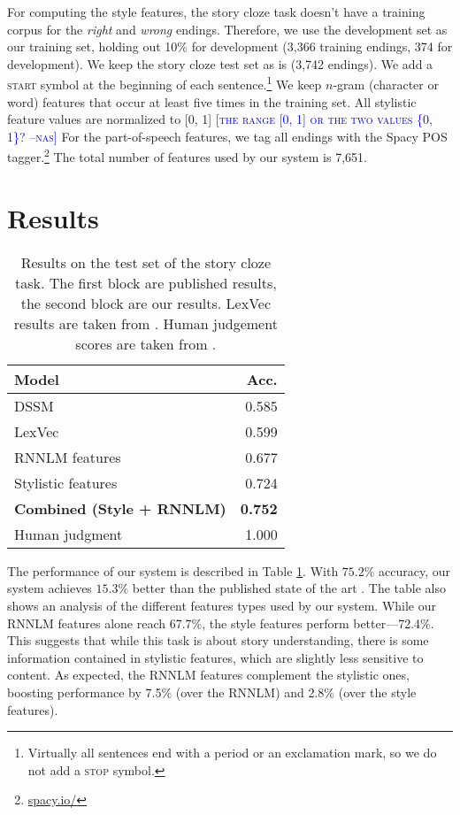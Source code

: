 \documentclass[11pt]{article}
\newcommand{\nascomment}[1]{\textcolor{blue}{[\textsc{#1 --nas}]}}
\begin{document}
For computing the style features, the story cloze task doesn't have a training corpus for the {\it right} and {\it wrong} endings.
Therefore, we use the development set as our training set, holding out 10\% for development
(3,366 training endings, 374 for development). We keep the story cloze test set as is (3,742 endings).
We add a \textsc{start} symbol at the beginning
of each sentence.\footnote{Virtually all sentences end with a period
  or an exclamation mark, so we do not add a \textsc{stop} symbol.} 
 We keep $n$-gram (character or word) features that occur at least five times in the training set.
All stylistic feature values are normalized to [0, 1] \nascomment{the
  range [0, 1] or the two values \{0, 1\}?}
For the part-of-speech features, we tag all endings with the Spacy POS tagger.\footnote{\url{spacy.io/}}
The total number of features used by our system is 7,651.


\section{Results}

\begin{table}%
\begin{center}
\begin{tabular}{|l|r|} \hline
{\bf Model} & {\bf Acc.} \\ \hline
{DSSM} \cite{Mostafazadeh:2016} & 0.585 \\ 
{LexVec} \cite{Salle:2016} & 0.599 \\ \hline\hline
{RNNLM features}		& 0.677 \\ 
{Stylistic features} & {0.724} \\ 
{\bf Combined (Style + RNNLM)} & {\bf 0.752} \\ \hline\hline
Human judgment & 1.000 \\ \hline
\end{tabular}
\end{center}
\caption{\label{cloze_results}
Results on the test set of the  story cloze task. 
The first block are published results, the second block are our results.
LexVec results are taken from \cite{Speer:2016}.
Human judgement scores are taken from \cite{Mostafazadeh:2016}. 
}
\end{table}

The performance of our system is described in Table \ref{cloze_results}. 
With $75.2\%$ accuracy, our system achieves $15.3\%$ better than the published state of the art \cite{Salle:2016}. 
The table also shows an analysis of the different features types used by our system.
While our RNNLM features alone reach 67.7\%, the style features perform better---72.4\%. 
This suggests that while this task is about story understanding, 
there is some information contained in stylistic features, which are slightly less sensitive to content.
As expected, the RNNLM features complement the stylistic ones, boosting performance by 7.5\% (over the RNNLM) and 2.8\% (over the style features). 
\end{document}
